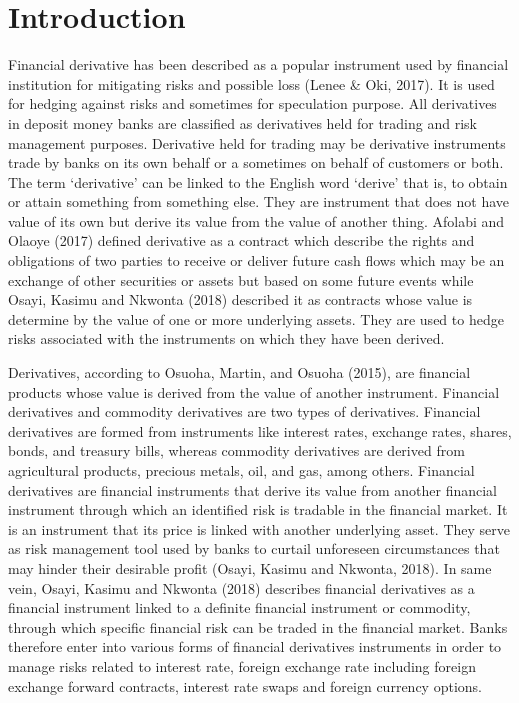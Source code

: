 \documentclass[a4 paper, 12pt]{report}
\theoremstyle{plain}
\begin{document}
\section{Introduction}
\noindent
\par Financial derivative has been described as a popular instrument used by financial
institution for mitigating risks and possible loss (Lenee \& Oki, 2017). It is used for hedging
against risks and sometimes for speculation purpose. All derivatives in deposit money
banks are classified as derivatives held for trading and risk management purposes.
Derivative held for trading may be derivative instruments trade by banks on its own
behalf or a sometimes on behalf of customers or both. The term 	`derivative' can be linked
to the English word `derive' that is, to obtain or attain something from something else.
They are instrument that does not have value of its own but derive its value from the
value of another thing. Afolabi and Olaoye (2017) defined derivative as a contract which
describe the rights and obligations of two parties to receive or deliver future cash flows
which may be an exchange of other securities or assets but based on some future events
while Osayi, Kasimu and Nkwonta (2018) described it as contracts whose value is
determine by the value of one or more underlying assets. They are used to hedge risks
associated with the instruments on which they have been derived.\\

\par Derivatives, according to Osuoha, Martin, and Osuoha (2015), are financial
products whose value is derived from the value of another instrument. Financial
derivatives and commodity derivatives are two types of derivatives. Financial derivatives
are formed from instruments like interest rates, exchange rates, shares, bonds, and
treasury bills, whereas commodity derivatives are derived from agricultural products,
precious metals, oil, and gas, among others. Financial derivatives are financial
instruments that derive its value from another financial instrument through which an
identified risk is tradable in the financial market. It is an instrument that its price is linked
with another underlying asset. They serve as risk management tool used by banks to
curtail unforeseen circumstances that may hinder their desirable profit (Osayi, Kasimu
and Nkwonta, 2018). In same vein, Osayi, Kasimu and Nkwonta (2018) describes financial
derivatives as a financial instrument linked to a definite financial instrument or
commodity, through which specific financial risk can be traded in the financial market.
Banks therefore enter into various forms of financial derivatives instruments in order to manage risks related to interest rate, foreign exchange rate including foreign exchange
forward contracts, interest rate swaps and foreign currency options.\\
\end{document}
